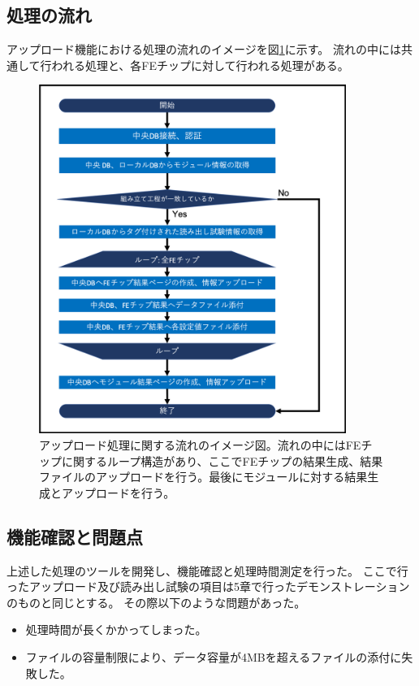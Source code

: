 \subsection{処理の流れ}

アップロード機能における処理の流れのイメージを図\ref{upload_algorithm}に示す。
流れの中には共通して行われる処理と、各FEチップに対して行われる処理がある。

\begin{figure}[bpt]\centering
\includegraphics[width=10cm]{upload_algorithm}
\caption[アップロード処理に関する流れのイメージ図]{アップロード処理に関する流れのイメージ図。流れの中にはFEチップに関するループ構造があり、ここでFEチップの結果生成、結果ファイルのアップロードを行う。最後にモジュールに対する結果生成とアップロードを行う。}
\label{upload_algorithm}
\end{figure}

\subsection{機能確認と問題点}
上述した処理のツールを開発し、機能確認と処理時間測定を行った。
ここで行ったアップロード及び読み出し試験の項目は5章で行ったデモンストレーションのものと同じとする。
その際以下のような問題があった。
\begin{itemize}
  \item 処理時間が長くかかってしまった。
  \item ファイルの容量制限により、データ容量が4MBを超えるファイルの添付に失敗した。
\end{itemize}

